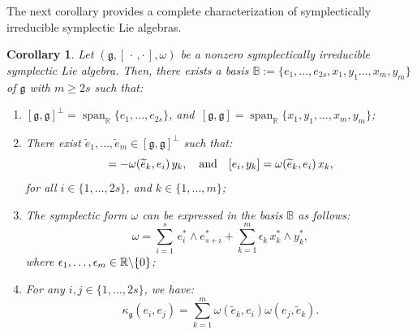 \documentclass[final,1p,times,nopreprintline]{elsarticle}
\newtheorem{corollary}{Corollary}[section]
\theoremstyle{definition}
\numberwithin{equation}{section}
\newcommand{\rel}{\mathbb{R}}
\newcommand{\w}{\omega}
\newcommand{\et}{\quad \textnormal{and}\quad}
\newcommand{\g}{\mathfrak{g}}
\newcommand{\Span}{\operatorname{span}}
\numberwithin{equation}{section}
\begin{document}
The next corollary provides a complete characterization of symplectically irreducible symplectic Lie algebras.

\begin{corollary}\label{CompCharaOfIrrSymLiAlg}
	Let $(\g,[\,\cdot\,,\cdot\,],\w)$ be a nonzero symplectically irreducible symplectic Lie algebra. Then, there exists a basis $\mathbb{B}:=\{e_1,\dots,e_{2s},x_1,y_1\dots,x_m,y_m\}$ of $\g$ with $m\geqslant 2s$ such that:
	\begin{enumerate}
		\item $[\g,\g]^\perp=\Span_\rel\{e_1,\dots,e_{2s}\}$, and $\,[\g,\g]=\Span_\rel\{x_1,y_1,\ldots,x_m,y_m\}$;
		\item There exist $\widetilde{e}_1,\ldots,\widetilde{e}_m\in[\g,\g]^\perp$ such that:
		\begin{equation*}
			[e_i,x_k]= -\w(\widetilde{e}_k,e_i)\,y_k,\et [e_i,y_k]= \w(\widetilde{e}_k,e_i)\,x_k,
		\end{equation*}  
		for all $i\in \{1,\dots,2s\}$, and $k\in \{1,\dots,m\}$; 
		\item The symplectic form $\w$ can be expressed in the basis $\mathbb{B}$ as follows:
		\begin{equation*}
			\omega=\sum_{i=1}^{s}\,e_i^*\wedge e_{s+i}^*+\sum_{k=1}^{m}\epsilon_k\,x_k^*\wedge y_k^*,
		\end{equation*}
		where $\epsilon_1,\ldots,\epsilon_m\in{\Bbb R}\backslash \{0\}$;
		\item For any $i,j\in\{1,\dots,2s\}$, we have:
		\begin{equation*}
			\kappa_\g(e_i,e_j)=\sum_{k=1}^{m}\w(\widetilde{e}_k,e_i)\w(e_j,\widetilde{e}_k).
		\end{equation*}
	\end{enumerate}
\end{corollary}
\end{document}
